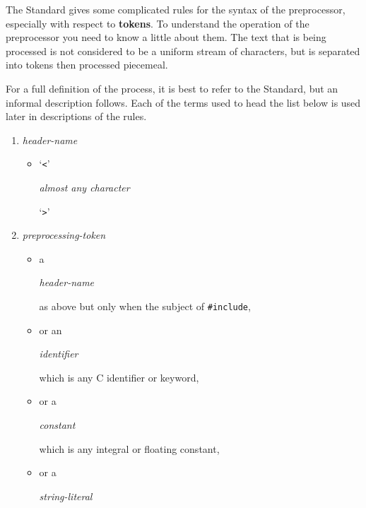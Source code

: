   The Standard gives some complicated rules for the syntax of the
   preprocessor, especially with respect to \textbf{tokens}. To understand
   the operation of the preprocessor you need to know a little about them.
   The text that is being processed is not considered to be a uniform stream
   of characters, but is separated into tokens then processed piecemeal.


  For a full definition of the process, it is best to refer to the
   Standard, but an informal description follows. Each of the terms used to
   head the list below is used later in descriptions of the rules.


  \begin{enumerate}
   \item \begin{center}\textit{header-name}\end{center}

    \begin{itemize}
     \item `\texttt{<}' \begin{center}\textit{almost any character}\end{center}

      `\texttt{>}'
    \end{itemize}
   
   \item \begin{center}\textit{preprocessing-token}\end{center}

    \begin{itemize}
     \item a \begin{center}\textit{header-name}\end{center}

 as above but only when the subject of
      \texttt{\#include},
     \item or an \begin{center}\textit{identifier}\end{center}

 which is any C identifier or
      keyword,
     \item or a \begin{center}\textit{constant}\end{center}

 which is any integral or floating
      constant,
     \item or a \begin{center}\textit{string-literal}\end{center}


\end{itemize}
\end{enumerate}
